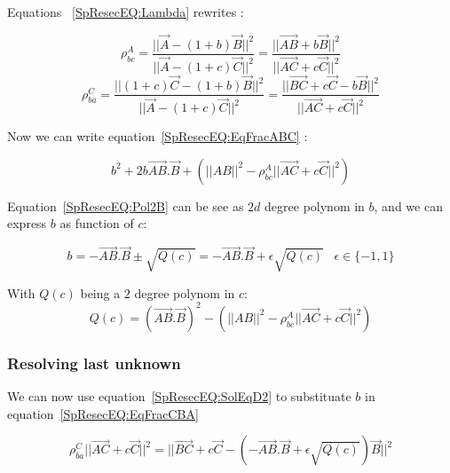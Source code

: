 Equations ~\ref{SpResecEQ:Lambda} rewrites :

\begin{equation}
	\rho^A_{bc}  
	= \frac{|| \Vec{A} -  (1+b) \Vec{B} ||^2 }{||\Vec{A} - (1+c) \Vec{C}||^2}
	= \frac{|| \overrightarrow{AB} +  b \Vec{B} ||^2 }{||\overrightarrow{AC}  + c \Vec{C}||^2}  \label{SpResecEQ:EqFracABC}
\end{equation}
\begin{equation}
	\rho^C_{ba}  
	= \frac{|| (1+c) \Vec{C} -  (1+b) \Vec{B} ||^2 } {||\Vec{A} -  (1+c) \Vec{C}||^2}
	= \frac{|| \overrightarrow{BC} + c \Vec{C} -  b \Vec{B} ||^2 } {||\overrightarrow{AC}  + c \Vec{C}||^2}
	 \label{SpResecEQ:EqFracCBA}
\end{equation}

Now we can write equation~\ref{SpResecEQ:EqFracABC} :

\begin{equation}
	b^2 + 2 b \overrightarrow{AB}. \Vec{B} + (||AB||^2 -   \rho^A_{bc} ||\overrightarrow{AC}  + c \Vec{C}||^2)
	\label{SpResecEQ:Pol2B}
\end{equation}

Equation~\ref{SpResecEQ:Pol2B} can be see as $2d$ degree polynom in $b$, and we can express $b$ as function of $c$:

\begin{equation}
	b = -\overrightarrow{AB}. \Vec{B} \pm \sqrt{Q(c)}  = -\overrightarrow{AB}. \Vec{B} + \epsilon \sqrt{Q(c)} 
	 \;\;\;  \epsilon \in \{-1,1\}  \label{SpResecEQ:SolEqD2}
\end{equation}

With $Q(c)$ being a $2$ degree polynom in $c$:
\begin{equation}
	Q(c) = (\overrightarrow{AB}. \Vec{B})^2 -  (||AB||^2 -   \rho^A_{bc} ||\overrightarrow{AC}  + c \Vec{C}||^2)
\end{equation}

\subsubsection{Resolving last unknown}

We can now use equation~\ref{SpResecEQ:SolEqD2} to substituate $b$  in equation~\ref{SpResecEQ:EqFracCBA}

\begin{equation}
	\rho^C_{ba}   ||\overrightarrow{AC}  + c \Vec{C}||^2
	= || \overrightarrow{BC} + c \Vec{C} -  (-\overrightarrow{AB}. \Vec{B} + \epsilon \sqrt{Q(c)}) \Vec{B} ||^2 
	\label{SpResecEQ:EqcInit}
\end{equation}

